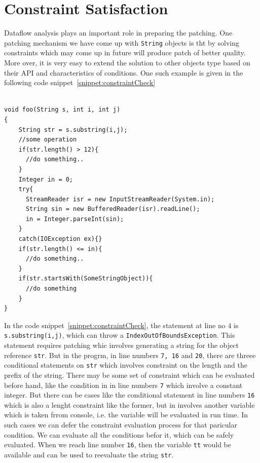 \section{Constraint Satisfaction}
\label{sec:constraintSatisfaction}

Dataflow analysis plays an important role in preparing the patching. One
patching mechanism we have come up with \texttt{String} objects is tht by
solving constraints which may come up in future will produce patch of better
quality. More over, it is very easy to extend the solution to other objects type
based on their API and characteristics of conditions. One such example is given
in the following code snippet~\ref{snippet:constraintCheck}

\onehalfspacing
\lstset{language=Java, caption=Better patching mechanism with constraint
satisfaction, label = snippet:constraintCheck}
\begin{lstlisting}

void foo(String s, int i, int j)
{
	String str = s.substring(i,j);
	//some operation
	if(str.length() > 12){
	  //do something..
	}
	Integer in = 0;
	try{
	  StreamReader isr = new InputStreamReader(System.in);
	  String sin = new BufferedReader(isr).readLine();
	  in = Integer.parseInt(sin);
	}
	catch(IOException ex){}
	if(str.length() <= in){
	  //do something..
	}
	if(str.startsWith(SomeStringObject)){
	  //do something
	}
}

\end{lstlisting}

In the code snippet~\ref{snippet:constraintCheck}, the statement at line no $4$
is \texttt{s.substring(i,j)}, which can throw a
\texttt{IndexOutOfBoundsException}. This statement requires patching whic
involves generating a string for the object reference \texttt{str}. But in the
progrm, in line numbers \texttt{7, 16} and \texttt{20}, there are threee
conditional statements on \texttt{str} which involves constraint on the length
and the prefix of the string. There may be some set of constraint which can be
evaluated before hand, like the condition in in line numbers \texttt{7} which
involve a constant integer. But there can be cases like the conditional
statement in line numbers \texttt{16} which is also a lenght constraint like the
former, but in involves another variable which is taken frrom console, i.e. the
variable will be evaluated in run time. In such cases we can defer the
constraint evaluation process for that paricular condition. We can evaluate all
the conditions befor it, which can be safely evaluated. When we reach line
number \texttt{16}, then the variable \texttt{tt} would be available and can be
used to reevaluate the string \texttt{str}.

